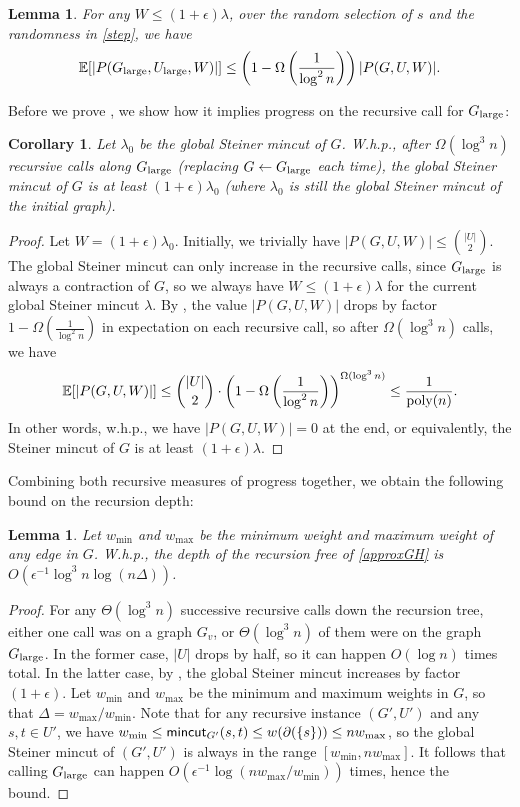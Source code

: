 \documentclass{article}
\newcommand{\f}{\frac}
\newcommand{\cd}{\cdot}
\newcommand{\bn}{\binom}
\newcommand{\logn}{\log n}
\newcommand{\inv}{^{-1}}
\newcommand{\e}{\epsilon}
\newcommand{\De}{\Delta}
\newcommand{\la}{\lambda}
\newcommand{\pt}{\partial}
\newcommand{\Om}{\Omega}
\newcommand{\Th}{\Theta}
\newcommand{\E}{\mathbb E}
\newcommand{\1}{\mathbbm 1}
\newcommand{\poly}{\textup{poly}}
\newcommand{\lp}{\left(}
\newcommand{\rp}{\right)}
\newtheorem{lemma}[theorem]{Lemma}
\newtheorem{corollary}[theorem]{Corollary}
\newcommand{\BL}{\begin{lemma}}
\newcommand{\EL}{\end{lemma}}
\newcommand{\BC}{\begin{corollary}}
\newcommand{\EC}{\end{corollary}}
\newcommand{\BP}{\begin{proof}}
\newcommand{\EP}{\end{proof}}
\newcommand{\leml}[1]{\label{lem:#1}}
\newcommand{\lem}[1]{\Cref{lem:#1}}
\newcommand{\corl}[1]{\label{cor:#1}}
\newcommand{\cor}[1]{\Cref{cor:#1}}
\newcommand{\mincut}{\textsf{\textup{mincut}}}
\newcommand{\lar}{{\textup{large}}}
\begin{document}
\BL\leml{P}
For any $W\le(1+\e)\la$, over the random selection of $s$ and the randomness in \ref{step}, we have
\[ \E[|P(G_\lar,U_\lar,W)|] \le \lp1-\Om\lp\f1{\log^2n}\rp\rp|P(G,U,W)| .\]
\EL

Before we prove \lem{P}, we show how it implies progress on the recursive call for $G_\lar$:
\BC\corl{mincut-increase}
Let $\la_0$ be the global Steiner mincut of $G$.
W.h.p., after $\Om(\log^3n)$ recursive calls along $G_\lar$ (replacing $G\gets G_\lar$ each time), the global Steiner mincut of $G$ is at least $(1+\e)\la_0$ (where $\la_0$ is still the global Steiner mincut of the initial graph).
\EC
\BP
Let $W=(1+\e)\la_0$.
Initially, we trivially have $|P(G,U,W)|\le\bn{|U|}2$. The global Steiner mincut can only increase in the recursive calls, since $G_\lar$ is always a contraction of $G$, so we always have $W\le(1+\e)\la$ for the current global Steiner mincut $\la$. By \lem{P}, the value $|P(G,U,W)|$ drops by factor $1-\Om(\f1{\log^2n})$ in expectation on each recursive call, so after $\Om(\log^3n)$ calls, we have
\[ \E[|P(G,U,W)|]\le\bn{|U|}2\cd\lp1-\Om\lp\f1{\log^2n}\rp\rp^{\Om(\log^3n)}\le\f1{\poly(n)} .\]
In other words, w.h.p., we have $|P(G,U,W)|=0$ at the end, or equivalently, the Steiner mincut of $G$ is at least $(1+\e)\la$.
\EP

Combining both recursive measures of progress together, we obtain the following bound on the recursion depth:
\BL\leml{depth}
Let $w_{\min}$ and $w_{\max}$ be the minimum weight and maximum weight of any edge in $G$.
W.h.p., the depth of the recursion free of \ref{approxGH} is $O(\e\inv\log^3n\log(n\De))$.
\EL
\BP
For any $\Th(\log^3n)$ successive recursive calls down the recursion tree, either one call was on a graph $G_v$, or $\Th(\log^3n)$ of them were on the graph $G_\lar$. In the former case, $|U|$ drops by half, so it can happen $O(\logn)$ times total. In the latter case, by \cor{mincut-increase}, the global Steiner mincut increases by factor $(1+\e)$. Let $w_{\min}$ and $w_{\max}$ be the minimum and maximum weights in $G$, so that $\De=w_{\max}/w_{\min}$. Note that for any recursive instance $(G',U')$ and any $s,t\in U'$, we have $w_{\min}\le\mincut_{G'}(s,t)\le w(\pt(\{s\}))\le nw_{\max}$, so the global Steiner mincut of $(G',U')$ is always in the range $[w_{\min},nw_{\max}]$. It follows that calling $G_\lar$ can happen $O(\e\inv\log(nw_{\max}/w_{\min}))$ times, hence the bound.
\EP
\end{document}
